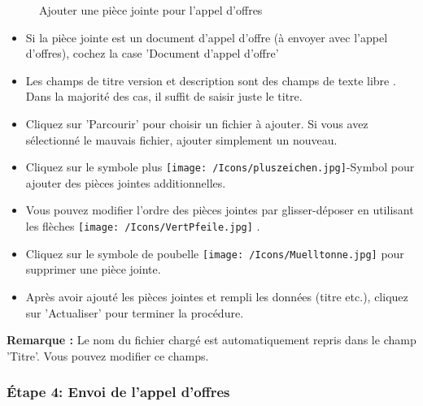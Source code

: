 \begin{figure}[H]
\caption{Ajouter une pièce jointe pour l'appel d'offres}
\end{figure}

\begin{itemize}
\item Si la pièce jointe est un document d'appel d'offre (à envoyer avec l'appel d'offres), cochez la case 'Document d'appel d'offre' 
\item Les champs de titre version et description sont des champs de texte libre . Dans la majorité des cas, il suffit de saisir juste le titre.
\item Cliquez sur 'Parcourir'  pour choisir un fichier à ajouter. Si vous avez sélectionné le mauvais fichier, 
ajouter simplement un nouveau.
\item Cliquez sur le symbole plus \texttt{[image: /Icons/pluszeichen.jpg]}-Symbol  pour ajouter des pièces jointes additionnelles.
\item Vous pouvez modifier l'ordre des pièces jointes par glisser-déposer en utilisant les flèches \texttt{[image: /Icons/VertPfeile.jpg]} .
\item Cliquez sur le symbole de poubelle \texttt{[image: /Icons/Muelltonne.jpg]}  pour supprimer une pièce jointe.
\item Après avoir ajouté les pièces jointes et rempli les données (titre etc.), cliquez sur 'Actualiser'  pour terminer la procédure.
\end{itemize}

\textbf{Remarque :} Le nom du fichier chargé est automatiquement repris dans le champ 'Titre'. Vous pouvez modifier ce champs.

\subsubsection{Étape 4: Envoi de l'appel d'offres}

